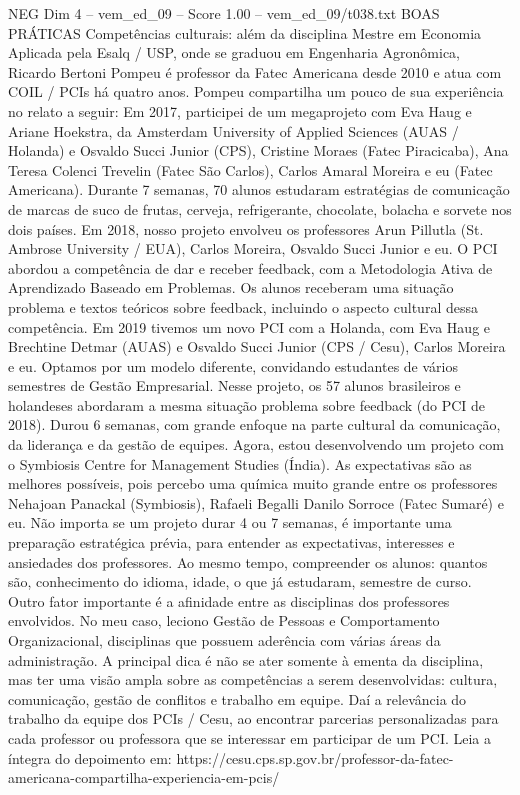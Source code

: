 \begin{textsample}{NEG Dim 4 – vem\_ed\_09 – Score 1.00 – vem\_ed\_09/t038.txt}  \label{ex:f4_neg_011}
BOAS PRÁTICAS Competências culturais: além da disciplina Mestre em Economia Aplicada pela Esalq / USP, onde se graduou em Engenharia Agronômica, Ricardo Bertoni Pompeu é professor da Fatec Americana desde 2010 e atua com COIL / PCIs há quatro anos.
Pompeu compartilha um pouco de sua experiência no relato a seguir: Em 2017, participei de um megaprojeto com Eva Haug e Ariane Hoekstra, da Amsterdam University of Applied Sciences (AUAS / Holanda) e Osvaldo Succi Junior (CPS), Cristine Moraes (Fatec Piracicaba), Ana Teresa Colenci Trevelin (Fatec São Carlos), Carlos Amaral Moreira e eu (Fatec Americana).
Durante 7 semanas, 70 alunos estudaram estratégias de comunicação de marcas de suco de frutas, cerveja, refrigerante, chocolate, bolacha e sorvete nos dois países.
Em 2018, nosso projeto envolveu os professores Arun Pillutla (St.
Ambrose University / EUA), Carlos Moreira, Osvaldo Succi Junior e eu.
O PCI abordou a competência de dar e receber feedback, com a Metodologia Ativa de Aprendizado Baseado em Problemas.
Os alunos receberam uma situação problema e textos teóricos sobre feedback, incluindo o aspecto cultural dessa competência.
Em 2019 tivemos um novo PCI com a Holanda, com Eva Haug e Brechtine Detmar (AUAS) e Osvaldo Succi Junior (CPS / Cesu), Carlos Moreira e eu.
Optamos por um modelo diferente, convidando estudantes de vários semestres de Gestão Empresarial.
Nesse projeto, os 57 alunos brasileiros e holandeses abordaram a mesma situação problema sobre feedback (do PCI de 2018).
Durou 6 semanas, com grande enfoque na parte cultural da comunicação, da liderança e da gestão de equipes.
Agora, estou desenvolvendo um projeto com o Symbiosis Centre for Management Studies (Índia).
As expectativas são as melhores possíveis, pois percebo uma química muito grande entre os professores Nehajoan Panackal (Symbiosis), Rafaeli Begalli Danilo Sorroce (Fatec Sumaré) e eu.
Não importa se um projeto durar 4 ou 7 semanas, é importante uma preparação estratégica prévia, para entender as expectativas, interesses e ansiedades dos professores.
Ao mesmo tempo, compreender os alunos: quantos são, conhecimento do idioma, idade, o que já estudaram, semestre de curso.
Outro fator importante é a afinidade entre as disciplinas dos professores envolvidos.
No meu caso, leciono Gestão de Pessoas e Comportamento Organizacional, disciplinas que possuem aderência com várias áreas da administração.
A principal dica é não se ater somente à ementa da disciplina, mas ter uma visão ampla sobre as competências a serem desenvolvidas: cultura, comunicação, gestão de conflitos e trabalho em equipe.
Daí a relevância do trabalho da equipe dos PCIs / Cesu, ao encontrar parcerias personalizadas para cada professor ou professora que se interessar em participar de um PCI.
Leia a íntegra do depoimento em: https://cesu.cps.sp.gov.br/professor-da-fatec-americana-compartilha-experiencia-em-pcis/

\end{textsample}
